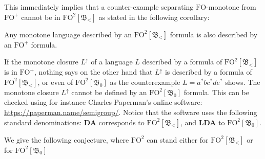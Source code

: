\documentclass[a4paper,UKenglish,cleveref, autoref, thm-restate]{lipics-v2021}
\newcommand{\FO}{\mathrm{FO}}
\newcommand{\FOp}{\FO^+}
\newcommand{\FOtw}{\FO^2}
\newcommand{\bin}{\mathfrak{B}}
\begin{document}
This immediately implies that a counter-example separating $\FO$-monotone from $\FOp$ cannot be in $\FOtw[\bin_<]$ as stated in the following corollary:

\begin{corollary}\label{FO2clot}
    Any monotone language described by an $\FOtw[\bin_<]$ formula is also described by an $\FOp$ formula.
\end{corollary}







































If the monotone closure $L^{\uparrow}$ of a language $L$ described by a formula of $\FOtw[\bin_<]$ is in $\FOp$, nothing says on the other hand that $L^{\uparrow}$ is described by a formula of $\FOtw[\bin_<]$, or even of $\FOtw[\bin_0]$ as the counterexample $L=a^*bc^*de^*$ shows.
The monotone closure $L^{\uparrow}$ cannot be defined by an $\FOtw[\bin_0]$ formula.
This can be checked using for instance Charles Paperman's online software: \url{https://paperman.name/semigroup/}.
Notice that the software uses the following standard denominations: \textbf{DA} corresponds to $\FOtw[\bin_<]$, and \textbf{LDA} to $\FOtw[\bin_0]$.






























We give the following conjecture, where $\FOtw$ can stand either for $\FOtw[\bin_<]$ or for $\FOtw[\bin_0]$
\end{document}
